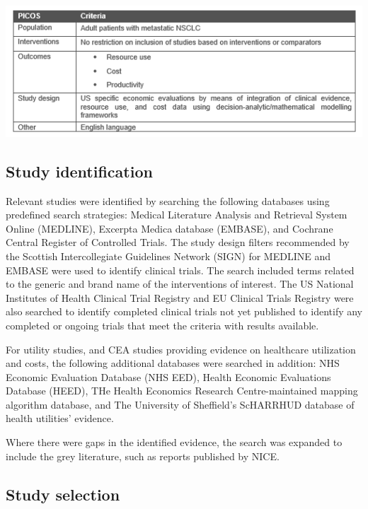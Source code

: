 \documentclass[11pt,final,fleqn]{article}\usepackage[]{graphicx}\usepackage[]{color}
\theoremstyle{plain}
\begin{document}
{\begin{appendices}
\includegraphics[scale=1]{Appendix Table 5.PNG} 

\subsection{Study identification}

Relevant studies were identified by searching the following databases using predefined search strategies: Medical Literature Analysis and Retrieval System Online (MEDLINE), Excerpta Medica database (EMBASE), and Cochrane Central Register of Controlled Trials. The study design filters recommended by the Scottish Intercollegiate Guidelines Network (SIGN) for MEDLINE and EMBASE were used to identify clinical trials. The search included terms related to the generic and brand name of the interventions of interest. The US National Institutes of Health Clinical Trial Registry and EU Clinical Trials Registry were also searched to identify completed clinical trials not yet published to identify any completed or ongoing trials that meet the criteria with results available.

For utility studies, and CEA studies providing evidence on healthcare utilization and costs, the following additional databases were searched in addition: NHS Economic Evaluation Database (NHS EED), Health Economic Evaluations Database (HEED), THe Health Economics Research Centre-maintained mapping algorithm database, and The University of Sheffield's ScHARRHUD database of health utilities' evidence.

Where there were gaps in the identified evidence, the search was expanded to include the grey literature, such as reports published by NICE.

\subsection{Study selection}


\end{appendices}}
\end{document}
